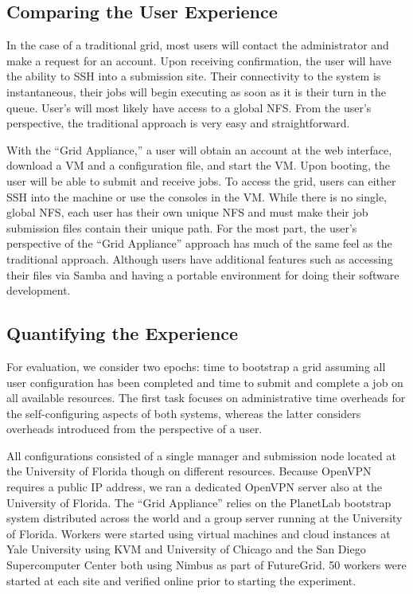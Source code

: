 \documentclass[twocolumn]{svjour3}
\begin{document}
\subsection{Comparing the User Experience}

In the case of a traditional grid, most users will contact the administrator
and make a request for an account.  Upon receiving confirmation, the user will
have the ability to SSH into a submission site.  Their connectivity to the
system is instantaneous, their jobs will begin executing as soon as it is their
turn in the queue.  User's will most likely have access to a global NFS.  From
the user's perspective, the traditional approach is very easy and
straightforward.

With the ``Grid Appliance,'' a user will obtain an account at the web
interface, download a VM and a configuration file, and start the VM.  Upon
booting, the user will be able to submit and receive jobs.  To access the grid,
users can either SSH into the machine or use the consoles in the VM.  While
there is no single, global NFS, each user has their own unique NFS and must
make their job submission files contain their unique path.  For the most part,
the user's perspective of the ``Grid Appliance'' approach has much of the same
feel as the traditional approach.  Although users have additional features such
as accessing their files via Samba and having a portable environment for doing
their software development.

\subsection{Quantifying the Experience}

For evaluation, we consider two epochs: time to bootstrap a grid assuming all
user configuration has been completed and time to submit and complete a job on
all available resources.  The first task focuses on administrative time
overheads for the self-configuring aspects of both systems, whereas the latter
considers overheads introduced from the perspective of a user.

All configurations consisted of a single manager and submission node located at
the University of Florida though on different resources.  Because OpenVPN
requires a public IP address, we ran a dedicated OpenVPN server also at the
University of Florida.  The ``Grid Appliance'' relies on the PlanetLab
bootstrap system distributed across the world and a group server running at the
University of Florida.   Workers were started using virtual machines and cloud
instances at Yale University using KVM and University of Chicago and the San
Diego Supercomputer Center both using Nimbus as part of FutureGrid.  50 workers
were started at each site and verified online prior to starting the experiment.
\end{document}
